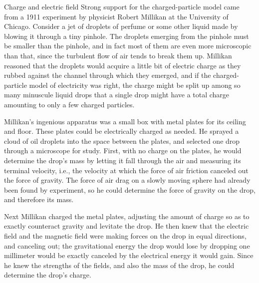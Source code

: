 \begin{envsubsection}{Charge and electric field}
	Strong support for the charged-particle model came from a
	1911 experiment by physicist Robert Millikan at the University of Chicago. Consider a jet
	of droplets of perfume or some other liquid made by blowing
	it through a tiny pinhole. The droplets emerging from the
	pinhole must be smaller than the pinhole, and in fact most
	of them are even more microscopic than that, since the
	turbulent flow of air tends to break them up. Millikan
	reasoned that the droplets would acquire a little bit of
	electric charge as they rubbed against the channel through
	which they emerged, and if the charged-particle model of
	electricity was right, the charge might be split up among so
	many minuscule liquid drops that a single drop might have a
	total charge amounting to only a few charged
	particles.

	Millikan's ingenious apparatus was a small box with metal plates
	for its ceiling and floor. These plates could be electrically
	charged as needed. He sprayed a cloud of oil droplets into
	the space between the plates, and selected one drop through
	a microscope for study. First, with no charge on the plates,
	he would determine the drop's mass by letting it fall
	through the air and measuring its terminal velocity, i.e.,
	the velocity at which the force of air friction canceled out
	the force of gravity. The force of air drag on a slowly
	moving sphere had already been found by experiment, so he
	could determine the force of gravity on the drop, and therefore
	its mass.

	Next Millikan charged the metal plates, adjusting the amount
	of charge so as to exactly counteract gravity and levitate
	the drop. He then knew that the electric field and the magnetic
	field were making forces on the drop in equal directions, and
	canceling out; the gravitational energy the drop would lose by
	dropping one millimeter would be exactly canceled by the electrical
	energy it would gain.
	Since he knew the strengths of the fields, and
	also the mass of the drop, he could determine the drop's charge.


\end{envsubsection}
